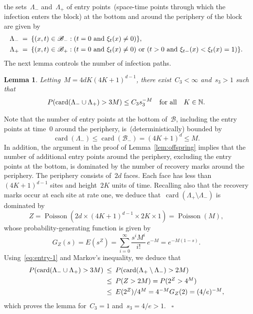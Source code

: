 \documentclass[letterpaper,11pt,twoside,keywordsasfootnote,addressatend,noinfoline]{article}
\newtheorem{lemma}[theorem]{Lemma}
\newenvironment{proof}{\noindent{\bf Proof.}}{\hspace*{2mm}~$\square$}
\newcommand{\N}{\mathbb{N}}
\newcommand{\B}{\mathscr{B}}
\newcommand{\n}{\hspace*{-5pt}}
\DeclareMathOperator{\card}{card}
\DeclareMathOperator{\poisson}{Poisson}
\begin{document}
 the sets~$\Lambda_-$ and~$\Lambda_+$ of entry points~(space-time points through which the infection enters the block) at the bottom and around the periphery of the block are given by
 $$ \begin{array}{rcl}
    \Lambda_- & \n = \n & \{(x, t) \in \B_- : (t = 0 \ \hbox{and} \ \xi_t (x) \neq 0) \}, \vspace*{4pt} \\
    \Lambda_+ & \n = \n & \{(x, t) \in \B_+ : (t = 0 \ \hbox{and} \ \xi_t (x) \neq 0) \ \hbox{or} \ (t > 0 \ \hbox{and} \ \xi_{t-} (x) < \xi_t (x) = 1) \}. \end{array} $$
 The next lemma controls the number of infection paths.
\begin{lemma}
\label{lem:entry}
 Letting~$M = 4dK (4K + 1)^{d - 1}$, there exist~$C_3 < \infty$ and~$s_3 > 1$ such that
 $$ P (\card (\Lambda_- \cup \Lambda_+) > 3M) \leq C_3 s_3^{-M} \quad \hbox{for all} \quad K \in \N. $$
\end{lemma}
\begin{proof}
 Note that the number of entry points at the bottom of~$\B$, including the entry points at time~0 around the periphery, is~(deterministically) bounded by
\begin{equation}
\label{eq:entry-1}
\card (\Lambda_-) \leq \card (\B_-) = (4K + 1)^d \leq M.
\end{equation}
 In addition, the argument in the proof of Lemma~\ref{lem:offspring} implies that the number of additional entry points around the periphery, excluding the entry points at the bottom, is dominated by the number of recovery marks around the periphery.
 The periphery consists of~$2d$ faces.
 Each face has less than~$(4K + 1)^{d - 1}$ sites and height~$2K$ units of time.
 Recalling also that the recovery marks occur at each site at rate one, we deduce that~$\card (\Lambda_+ \setminus \Lambda_-)$ is dominated by
 $$ Z = \poisson (2d \times (4K + 1)^{d - 1} \times 2K \times 1) = \poisson (M), $$
 whose probability-generating function is given by
 $$ G_Z (s) = E (s^Z) = \sum_{i = 0}^{\infty} \frac{s^i M^i}{i!} \,e^{-M} = e^{-M (1 - s)}. $$
 Using~\eqref{eq:entry-1} and Markov's inequality, we deduce that
 $$ \begin{array}{rcl}
      P (\card (\Lambda_- \cup \Lambda_+) > 3M) & \n \leq \n &
      P (\card (\Lambda_+ \setminus \Lambda_-) > 2M) \vspace*{4pt} \\ & \n \leq \n &
      P (Z > 2M) = P (2^Z > 4^M) \vspace*{4pt} \\ & \n \leq \n &
      E (2^Z) / 4^M = 4^{-M} G_Z (2) = (4/e)^{-M}, \end{array} $$
 which proves the lemma for~$C_3 = 1$ and~$s_3 = 4/e > 1$.
\end{proof} \vspace*{8pt} \\
\end{document}
